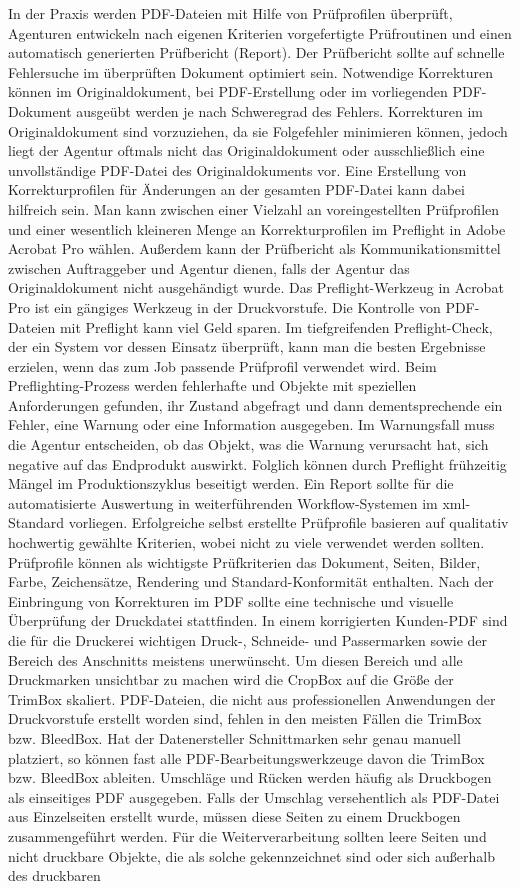 In der Praxis werden PDF-Dateien mit Hilfe von Prüfprofilen überprüft, Agenturen entwickeln nach eigenen Kriterien vorgefertigte Prüfroutinen und einen automatisch generierten Prüfbericht (Report). Der Prüfbericht sollte auf schnelle Fehlersuche im überprüften Dokument optimiert sein. Notwendige Korrekturen können im Originaldokument, bei PDF-Erstellung oder im vorliegenden PDF-Dokument ausgeübt werden je nach Schweregrad des Fehlers. Korrekturen im Originaldokument sind vorzuziehen, da sie Folgefehler minimieren können, jedoch liegt der Agentur oftmals nicht das Originaldokument oder ausschließlich eine unvollständige PDF-Datei des Originaldokuments vor. Eine Erstellung von Korrekturprofilen für Änderungen an der gesamten PDF-Datei kann dabei hilfreich sein. Man kann zwischen einer Vielzahl an voreingestellten Prüfprofilen und einer wesentlich kleineren Menge an Korrekturprofilen im Preflight in Adobe Acrobat Pro wählen. Außerdem kann der Prüfbericht als Kommunikationsmittel zwischen Auftraggeber und Agentur dienen, falls der Agentur das Originaldokument nicht ausgehändigt wurde. Das Preflight-Werkzeug in Acrobat Pro ist ein gängiges Werkzeug in der Druckvorstufe. Die Kontrolle von PDF-Dateien mit Preflight kann viel Geld sparen. Im tiefgreifenden Preflight-Check, der ein System vor dessen Einsatz überprüft, kann man die besten Ergebnisse erzielen, wenn das zum Job passende Prüfprofil verwendet wird. Beim Preflighting-Prozess werden fehlerhafte und Objekte mit speziellen Anforderungen gefunden, ihr Zustand abgefragt und dann dementsprechende ein Fehler, eine Warnung oder eine Information ausgegeben. Im Warnungsfall muss die Agentur entscheiden, ob das Objekt, was die Warnung verursacht hat, sich negative auf das Endprodukt auswirkt. Folglich können durch Preflight frühzeitig Mängel im Produktionszyklus beseitigt werden. Ein Report sollte für die automatisierte Auswertung in weiterführenden Workflow-Systemen im \gls{xml}-Standard vorliegen. Erfolgreiche selbst erstellte Prüfprofile basieren auf qualitativ hochwertig gewählte Kriterien, wobei nicht zu viele verwendet werden sollten. Prüfprofile können als wichtigste Prüfkriterien das Dokument, Seiten, Bilder, Farbe, Zeichensätze, Rendering und Standard-Konformität enthalten. Nach der Einbringung von Korrekturen im PDF sollte eine technische und visuelle Überprüfung der Druckdatei stattfinden. In einem korrigierten Kunden-PDF sind die für die Druckerei wichtigen Druck-, Schneide- und Passermarken sowie der Bereich des Anschnitts meistens unerwünscht. Um diesen Bereich und alle Druckmarken unsichtbar zu machen wird die CropBox auf die Größe der TrimBox skaliert. PDF-Dateien, die nicht aus professionellen Anwendungen der Druckvorstufe erstellt worden sind, fehlen in den meisten Fällen die TrimBox bzw. BleedBox. Hat der Datenersteller Schnittmarken sehr genau manuell platziert, so können fast alle PDF-Bearbeitungswerkzeuge davon die TrimBox bzw. BleedBox ableiten. Umschläge und Rücken werden häufig als Druckbogen als einseitiges PDF ausgegeben. Falls der Umschlag versehentlich als PDF-Datei aus Einzelseiten erstellt wurde, müssen diese Seiten zu einem Druckbogen zusammengeführt werden. Für die Weiterverarbeitung sollten leere Seiten und nicht druckbare Objekte, die als solche gekennzeichnet sind oder sich außerhalb des druckbaren 